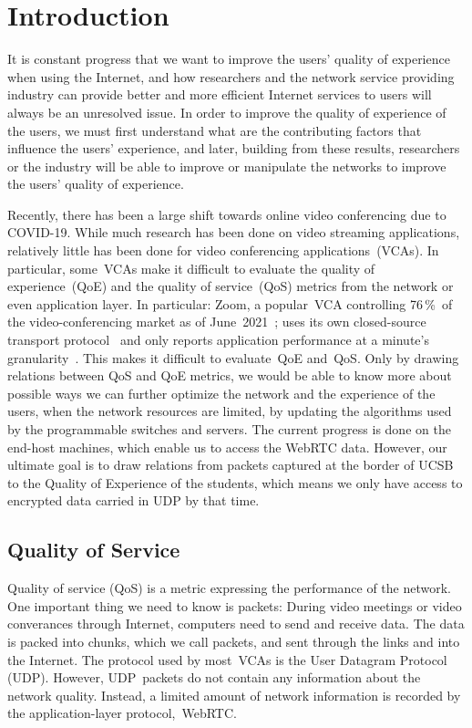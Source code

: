 \section{Introduction}\label{introduction}
    It is constant progress that we want to improve the users' quality of experience when using the Internet, and how researchers and the network service providing industry can provide better and more efficient Internet services to users will always be an unresolved issue. In order to improve the quality of experience of the users, we must first understand what are the contributing factors that influence the users' experience, and later, building from these results, researchers or the industry will be able to improve or manipulate the networks to improve the users' quality of experience.

    Recently, there has been a large shift towards online video conferencing due to COVID-19. While much research has been done on video streaming applications, relatively little has been done for video conferencing applications~(VCAs). In particular, some~VCAs make it difficult to evaluate the quality of experience~(QoE) and the quality of service~(QoS) metrics from the network or even application layer. In particular: Zoom, a popular~VCA controlling 76\,\%~of the video-conferencing market as of June~2021~\autocite{kim2021}; uses its own closed-source transport protocol~\autocite{marczak2020} and only reports application performance at a minute's granularity~\autocite{walia2019}. This makes it difficult to evaluate~QoE and~QoS. Only by drawing relations between QoS and QoE metrics, we would be able to know more about possible ways we can further optimize the network and the experience of the users, when the network resources are limited, by updating the algorithms used by the programmable switches and servers. The current progress is done on the end-host machines, which enable us to access the WebRTC data. However, our ultimate goal is to draw relations from packets captured at the border of UCSB to the Quality of Experience of the students, which means we only have access to encrypted data carried in UDP by that time. 

    \subsection{Quality of Service}\label{introduction:qos}
        Quality of service (QoS) is a metric expressing the performance of the network. One important thing we need to know is packets: During video meetings or video converances through Internet, computers need to send and receive data. The data is packed into chunks, which we call packets, and sent through the links and into the Internet. The protocol used by most~VCAs is the User Datagram Protocol (UDP). However, UDP~packets do not contain any information about the network quality. Instead, a limited amount of network information is recorded by the application-layer protocol,~WebRTC.

